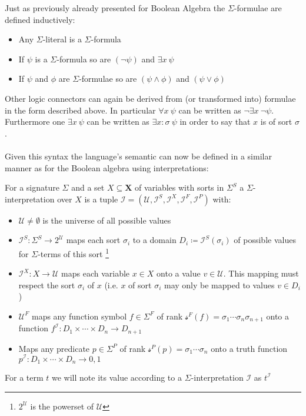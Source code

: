 \begin{definition}
Just as previously already presented for Boolean Algebra the $\Sigma$-formulae are defined inductively:
\begin{itemize}
    \item Any $\Sigma$-literal is a $\Sigma$-formula
    \item If $\psi$ is a $\Sigma$-formula so are $\left(\neg\psi\right)$ and $\exists x\ \psi$
    \item If $\psi$ and $\phi$ are $\Sigma$-formulae so are $\left(\psi\land\phi\right)$ and $\left(\psi\lor\phi\right)$
\end{itemize}
\end{definition}
Other logic connectors can again be derived from (or transformed into) formulae in the form described above. In particular $\forall x\ \psi$ can be written as $\neg\exists x\ \neg\psi$.\\
Furthermore one $\exists x\ \psi$ can be written as $\exists x\colon\!\sigma\ \psi$ in order to say that $x$ is of sort $\sigma$.

\paragraph{}
Given this syntax the language's semantic can now be defined in a similar manner as for the Boolean algebra using interpretations:

\begin{definition}
For a signature $\Sigma$ and a set $X\subseteq\mathbf{X}$ of variables with sorts in $\Sigma^S$ a $\Sigma$-interpretation over $X$ is a tuple
$\mathcal{I}=\left(\mathcal{U},\mathcal{I}^S, \mathcal{I}^X, \mathcal{I}^F, \mathcal{I}^P\right)$
with:
\begin{itemize}
    \item $\mathcal{U}\neq\emptyset$ is the universe of all possible values
    \item $\mathcal{I}^S\colon\Sigma^S\to2^\mathcal{U}$ 
        maps each sort $\sigma_i$ to a domain $D_i\coloneqq\mathcal{I}^S\left(\sigma_i\right)$ of possible values for $\Sigma$-terms of this sort
        \footnote{$2^\mathcal{U}$ is the powerset of $\mathcal{U}$}
    \item $\mathcal{I}^X\colon X\to \mathcal{U}$ maps each variable $x\in X$ onto a value $v\in\mathcal{U}$. This mapping must respect the sort $\sigma_i$ of $x$ (i.e. $x$ of sort $\sigma_i$ may only be mapped to values $v\in D_i$)
    \item $\mathcal{U}^F$ maps any function symbol $f\in\Sigma^F$ of rank  $\mathcal{s}^F\left(f\right)=\sigma_1\dotsi\sigma_n\sigma_{n+1}$ onto a function $f^\mathcal{I}\colon D_1\times\dotsi\times D_n \to D_{n+1}$
    \item Maps any predicate $p\in\Sigma^P$ of rank $\mathcal{s}^P\left(p\right)=\sigma_1\dotsi\sigma_n$ onto a truth function $p^\mathcal{I}\colon D_1\times\dotsi\times D_n \to {0,1}$
\end{itemize}
\end{definition}
For a term $t$ we will note its value according to a $\Sigma$-interpretation $\mathcal{I}$ as $t^\mathcal{I}$

